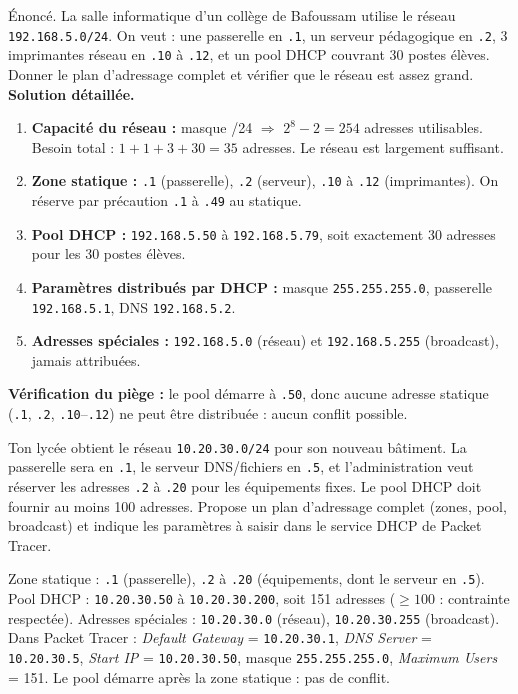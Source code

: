 \documentclass[11pt]{article}
\begin{document}
\begin{exoresolu}
Énoncé. La salle informatique d'un collège de Bafoussam utilise le réseau \texttt{192.168.5.0/24}. On veut : une passerelle en \texttt{.1}, un serveur pédagogique en \texttt{.2}, 3 imprimantes réseau en \texttt{.10} à \texttt{.12}, et un pool DHCP couvrant 30 postes élèves. Donner le plan d'adressage complet et vérifier que le réseau est assez grand.
\tcblower
\textbf{Solution détaillée.}
\begin{enumerate}
\item \textbf{Capacité du réseau :} masque /24 $\Rightarrow$ $2^8 - 2 = 254$ adresses utilisables. Besoin total : $1 + 1 + 3 + 30 = 35$ adresses. Le réseau est largement suffisant.
\item \textbf{Zone statique :} \texttt{.1} (passerelle), \texttt{.2} (serveur), \texttt{.10} à \texttt{.12} (imprimantes). On réserve par précaution \texttt{.1} à \texttt{.49} au statique.
\item \textbf{Pool DHCP :} \texttt{192.168.5.50} à \texttt{192.168.5.79}, soit exactement 30 adresses pour les 30 postes élèves.
\item \textbf{Paramètres distribués par DHCP :} masque \texttt{255.255.255.0}, passerelle \texttt{192.168.5.1}, DNS \texttt{192.168.5.2}.
\item \textbf{Adresses spéciales :} \texttt{192.168.5.0} (réseau) et \texttt{192.168.5.255} (broadcast), jamais attribuées.
\end{enumerate}
\textbf{Vérification du piège :} le pool démarre à \texttt{.50}, donc aucune adresse statique (\texttt{.1}, \texttt{.2}, \texttt{.10}--\texttt{.12}) ne peut être distribuée : aucun conflit possible.
\end{exoresolu}

\begin{exercice}
Ton lycée obtient le réseau \texttt{10.20.30.0/24} pour son nouveau bâtiment. La passerelle sera en \texttt{.1}, le serveur DNS/fichiers en \texttt{.5}, et l'administration veut réserver les adresses \texttt{.2} à \texttt{.20} pour les équipements fixes. Le pool DHCP doit fournir au moins 100 adresses. Propose un plan d'adressage complet (zones, pool, broadcast) et indique les paramètres à saisir dans le service DHCP de Packet Tracer.
\end{exercice}

\begin{corrige}[Exercice 1]
Zone statique : \texttt{.1} (passerelle), \texttt{.2} à \texttt{.20} (équipements, dont le serveur en \texttt{.5}). Pool DHCP : \texttt{10.20.30.50} à \texttt{10.20.30.200}, soit 151 adresses ($\geq 100$ : contrainte respectée). Adresses spéciales : \texttt{10.20.30.0} (réseau), \texttt{10.20.30.255} (broadcast). Dans Packet Tracer : \emph{Default Gateway} = \texttt{10.20.30.1}, \emph{DNS Server} = \texttt{10.20.30.5}, \emph{Start IP} = \texttt{10.20.30.50}, masque \texttt{255.255.255.0}, \emph{Maximum Users} = 151. Le pool démarre après la zone statique : pas de conflit.
\end{corrige}
\end{document}
